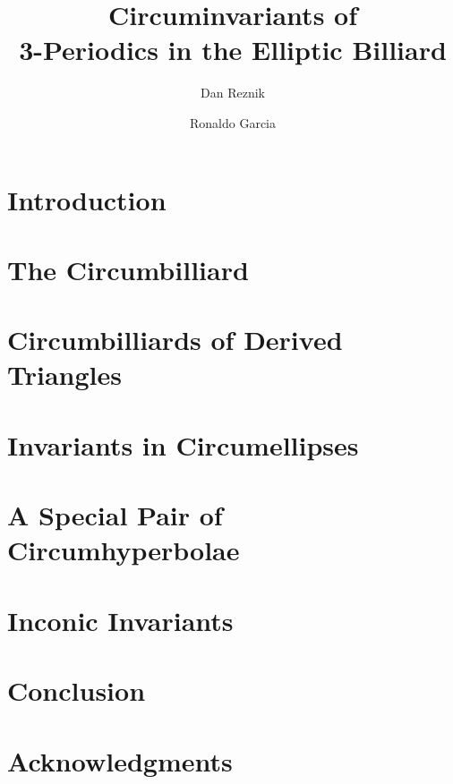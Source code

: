 \documentclass[a4paper,11pt]{amsart}
\title[Circuminvariants of 3-Periodics in the Elliptic Billiard]{Circuminvariants of\\ 3-Periodics in the Elliptic Billiard}
\author{Dan Reznik}
\author{Ronaldo Garcia}
\begin{document}
\maketitle


%

\section{Introduction}
\label{sec:intro}


%

\section{The Circumbilliard}
\label{sec:cb}


\section{Circumbilliards of Derived Triangles}
\label{sec:cb_derived}


\section{Invariants in Circumellipses}
\label{sec:circumellipses}


\section{A Special Pair of  Circumhyperbolae}
\label{sec:circumhyperbolae}


%

\section{Inconic Invariants}
\label{sec:inconic}


\section{Conclusion}
\label{sec:conclusion}


\section*{Acknowledgments}



 
%

\appendix

\end{document}
